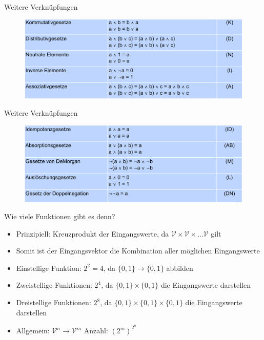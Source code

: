 \documentclass[12pt%
,aspectratio=169%
]{beamer}
\begin{document}
\begin{frame}{Weitere Verknüpfungen}
\begin{figure}
\includegraphics[scale=0.325]{pictures/ops1.png}
\end{figure}
\cite{hoffmann2020grundlagen}
\end{frame}

\begin{frame}{Weitere Verknüpfungen}
\begin{figure}
\includegraphics[scale=0.325]{pictures/ops2}
\end{figure}
\cite{hoffmann2020grundlagen}
\end{frame}

\begin{frame}{Wie viele Funktionen gibt es denn?}
\begin{itemize}
	\item Prinzipiell: Kreuzprodukt der Eingangswerte, da $\mathcal{V} \times \mathcal{V} \times \ldots \mathcal{V}$ gilt
	\item Somit ist der Eingangsvektor die Kombination aller möglichen Eingangswerte
	\item Einstellige Funktion: $2^2 = 4$, da $\{0,1\} \to \{0,1\}$ abbilden
	\item Zweistellige Funktionen: $2^4$, da $\{0,1\} \times \{0,1\}$ die Eingangswerte darstellen
	\item Dreistellige Funktionen: $2^8$, da $\{0,1\} \times \{0,1\} \times \{0,1\}$ die Eingangswerte darstellen
	\item Allgemein: $\mathcal{V}^n \to \mathcal{V}^m$ Anzahl: $(2^m)^{2^n}$ 
\end{itemize}
\end{frame}
\end{document}
